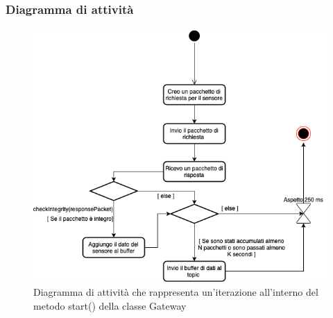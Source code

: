 	\subsubsection{Diagramma di attività}
		\begin{figure}[H]
			\centering
			\includegraphics[scale=0.500]{res/images/GATEWAY/gateway.start().png}
			\caption{Diagramma di attività che rappresenta un'iterazione all'interno del metodo start() della classe Gateway}
		\end{figure}








